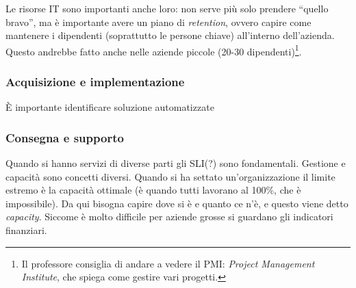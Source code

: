 Le risorse IT sono importanti anche loro: non serve più solo prendere ``quello 
bravo'', ma è importante avere un piano di \textit{retention}, ovvero capire 
come mantenere i dipendenti (soprattutto le persone chiave) all'interno 
dell'azienda. Questo andrebbe fatto anche nelle aziende piccole (20-30 
dipendenti)\footnote{Il professore consiglia di andare a vedere il PMI: 
\textit{Project Management Institute}, che spiega come gestire vari progetti.}.

\subsubsection{Acquisizione e implementazione}

È importante identificare soluzione automatizzate 


\subsubsection{Consegna e supporto}

Quando si hanno servizi di diverse parti gli SLI(?) sono fondamentali.
Gestione e capacità sono concetti diversi. Quando si ha settato 
un'organizzazione il limite estremo è la capacità ottimale (è quando tutti 
lavorano al 100\%, che è impossibile). Da qui bisogna capire dove si è e quanto 
ce n'è, e questo viene detto \textit{capacity}. Siccome è molto difficile per 
aziende grosse si guardano gli indicatori finanziari.
